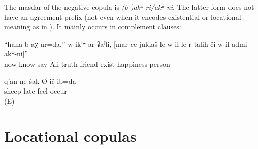 The masdar of the negative copula is \textit{{(b-)akʷ-ri\slash akʷ-ni}}. The latter form does not have an agreement prefix (not even when it encodes existential or locational meaning as in ). It mainly occurs in complement clauses:
%
\begin{exe}
	\ex	\label{ex:Now I know, says Ali, that there is no happy man than the one who has a true friend}
	\gll	``hana	b-aχ-ur=da,''	w-ik'ʷ-ar	ʡaˁli,	[mar-ce	juldaš	le-w-il-le-r	taliħ-či-w-il	admi	akʷ-ni]''\\
		now	know	say	Ali	truth	friend	exist	happiness	person	\\
	\glt	{}

	\ex	\label{ex:I guessed late that my sheep were not there}
		q'an-ne	šak	Ø-ič-ib=da\\
			sheep		late	feel	occur\\
	\glt	{} (E)
\end{exe}



\section{Locational copulas}
\label{sec:Locational copulae}

